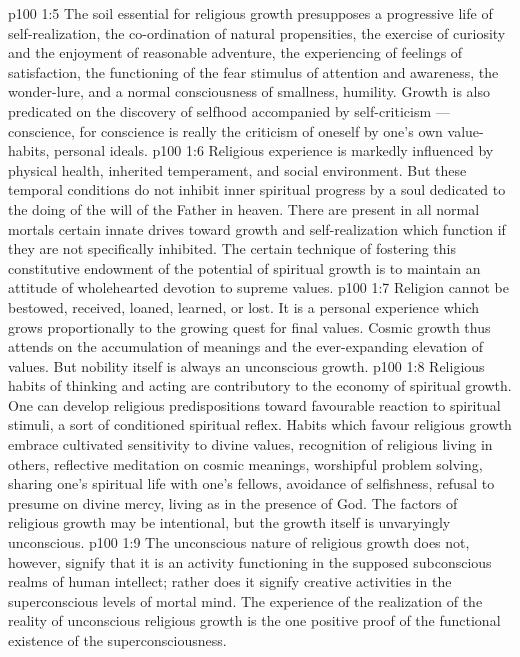 \vs p100 1:5 \pc The soil essential for religious growth presupposes a progressive life of self\hyp{}realization, the co\hyp{}ordination of natural propensities, the exercise of curiosity and the enjoyment of reasonable adventure, the experiencing of feelings of satisfaction, the functioning of the fear stimulus of attention and awareness, the wonder\hyp{}lure, and a normal consciousness of smallness, humility. Growth is also predicated on the discovery of selfhood accompanied by self\hyp{}criticism --- conscience, for conscience is really the criticism of oneself by one’s own value\hyp{}habits, personal ideals.
\vs p100 1:6 \pc Religious experience is markedly influenced by physical health, inherited temperament, and social environment. But these temporal conditions do not inhibit inner spiritual progress by a soul dedicated to the doing of the will of the Father in heaven. There are present in all normal mortals certain innate drives toward growth and self\hyp{}realization which function if they are not specifically inhibited. The certain technique of fostering this constitutive endowment of the potential of spiritual growth is to maintain an attitude of wholehearted devotion to supreme values.
\vs p100 1:7 Religion cannot be bestowed, received, loaned, learned, or lost. It is a personal experience which grows proportionally to the growing quest for final values. Cosmic growth thus attends on the accumulation of meanings and the ever\hyp{}expanding elevation of values. But nobility itself is always an unconscious growth.
\vs p100 1:8 Religious habits of thinking and acting are contributory to the economy of spiritual growth. One can develop religious predispositions toward favourable reaction to spiritual stimuli, a sort of conditioned spiritual reflex. Habits which favour religious growth embrace cultivated sensitivity to divine values, recognition of religious living in others, reflective meditation on cosmic meanings, worshipful problem solving, sharing one’s spiritual life with one’s fellows, avoidance of selfishness, refusal to presume on divine mercy, living as in the presence of God. The factors of religious growth may be intentional, but the growth itself is unvaryingly unconscious.
\vs p100 1:9 The unconscious nature of religious growth does not, however, signify that it is an activity functioning in the supposed subconscious realms of human intellect; rather does it signify creative activities in the superconscious levels of mortal mind. The experience of the realization of the reality of unconscious religious growth is the one positive proof of the functional existence of the superconsciousness.
